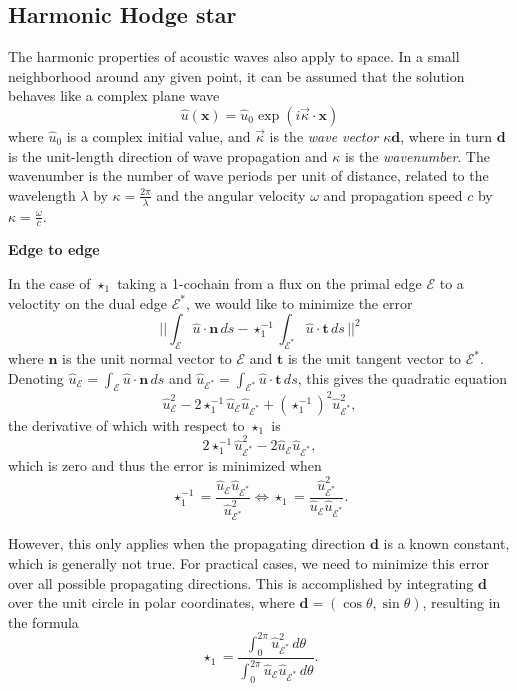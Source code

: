\documentclass[utf8,english]{gradu3}
\begin{document}
\subsection{Harmonic Hodge star}

The harmonic properties of acoustic waves also apply to space.
In a small neighborhood around any given point,
it can be assumed that the solution behaves like a complex plane wave
\begin{equation}\label{eq:plane_wave}
  \hat{u}(\mathbf{x}) = \hat{u}_0 \exp(i\vec{\kappa} \cdot \mathbf{x})
\end{equation}
where $\hat{u}_0$ is a complex initial value,
and $\vec{\kappa}$ is the \textit{wave vector} $\kappa \mathbf{d}$,
where in turn $\mathbf{d}$ is the unit-length direction of wave propagation
and $\kappa$ is the \textit{wavenumber}.
The wavenumber is the number of wave periods per unit of distance,
related to the wavelength $\lambda$ by $\kappa = \frac{2\pi}{\lambda}$
and the angular velocity $\omega$ and propagation speed $c$ by
$\kappa = \frac{\omega}{c}$.

\textbf{Edge to edge}

In the case of $\star_1$ taking a 1-cochain from a flux on the primal edge $\mathcal{E}$
to a veloctity on the dual edge $\mathcal{E}^*$,
we would like to minimize the error
\begin{equation}\label{eq:harmonic_error_norm}
  ||\int_{\mathcal{E}} \hat{u} \cdot \mathbf{n} \,ds
  - \star_1^{-1} \int_{\mathcal{E}^*} \hat{u} \cdot \mathbf{t} \,ds\,||^2
\end{equation}
where $\mathbf{n}$ is the unit normal vector to $\mathcal{E}$
and $\mathbf{t}$ is the unit tangent vector to $\mathcal{E}^*$.
Denoting $\hat{u}_{\mathcal{E}} = \int_{\mathcal{E}} \hat{u} \cdot \mathbf{n} \,ds$
and $\hat{u}_{\mathcal{E}^*} = \int_{\mathcal{E}^*} \hat{u} \cdot \mathbf{t} \,ds$,
this gives the quadratic equation
\[
\hat{u}_{\mathcal{E}}^2
- 2 \star_1^{-1} \hat{u}_{\mathcal{E}} \hat{u}_{\mathcal{E}^*}
+ (\star_1^{-1})^2 \hat{u}_{\mathcal{E}^*}^2,
\]
the derivative of which with respect to $\star_1$ is
\[
  2 \star_1^{-1} \hat{u}_{\mathcal{E}^*}^2 - 2 \hat{u}_{\mathcal{E}} \hat{u}_{\mathcal{E}^*},
\]
which is zero and thus the error is minimized when
\[
  \star_1^{-1} = \frac{\hat{u}_{\mathcal{E}} \hat{u}_{\mathcal{E}^*}}{\hat{u}_{\mathcal{E}^*}^2}
  \iff \star_1 = \frac{\hat{u}_{\mathcal{E}^*}^2}{\hat{u}_{\mathcal{E}} \hat{u}_{\mathcal{E}^*}}.
\]

However, this only applies when the propagating direction $\mathbf{d}$
is a known constant, which is generally not true.
For practical cases, we need to minimize this error
over all possible propagating directions.
This is accomplished by integrating $\mathbf{d}$ over the unit circle
in polar coordinates, where $\mathbf{d} = (\cos\theta, \sin\theta)$,
resulting in the formula
\begin{equation}\label{eq:star_1_integral}
  \star_1 = \frac{\int_{0}^{2\pi} \hat{u}_{\mathcal{E}^*}^2 \,d\theta}
  {\int_{0}^{2\pi} \hat{u}_{\mathcal{E}} \hat{u}_{\mathcal{E}^*} \,d\theta}.
\end{equation}
\end{document}
